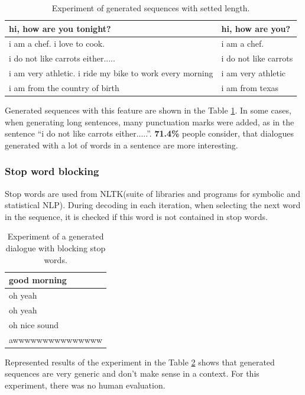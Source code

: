 \begin{table}[ht]
\centering
 \begin{tabular}{|p{7cm}|p{7cm}|} 
 \hline
   hi, how are you tonight? & hi, how are you?\\
 \hline
  i am a chef. i love to cook. & i am a chef. \\
 \hline
  i do not like carrots either..... & i do not like carrots\\
 \hline 
  i am very athletic. i ride my bike to work every morning & i am very athletic\\
 \hline 
 i am from the country of birth & i am from texas\\
 \hline
 \end{tabular}
 \caption{Experiment of generated sequences with setted length.}
\label{tab:set_len}
\end{table}

Generated sequences with this feature are shown in the Table \ref{tab:set_len}. In some cases, when generating long sentences, many punctuation marks were added, as in the sentence ``i do not like carrots either.....''. \textbf{71.4\%} people consider, that dialogues generated with a lot of words in a sentence are more interesting.

\subsubsection{Stop word blocking}
Stop words are used from NLTK\protect\footnotemark (suite of libraries and programs for symbolic and statistical NLP). During decoding in each iteration, when selecting the next word in the sequence, it is checked if this word is not contained in stop words.

\begin{table}[ht]
\centering
 \begin{tabular}{|p{10cm}|} 
 \hline
  good morning \\
 \hline
  oh yeah \\
 \hline
  oh yeah \\
 \hline
  oh nice sound \\
 \hline 
  awwwwwwwwwwwwwww \\
 \hline
 \end{tabular}
 \caption{Experiment of a generated dialogue with blocking stop words.}
\label{tab:stop_words}
\end{table}
Represented results of the experiment in the Table \ref{tab:stop_words} shows that generated sequences are very generic and don't make sense in a context. For this experiment, there was no human evaluation.

